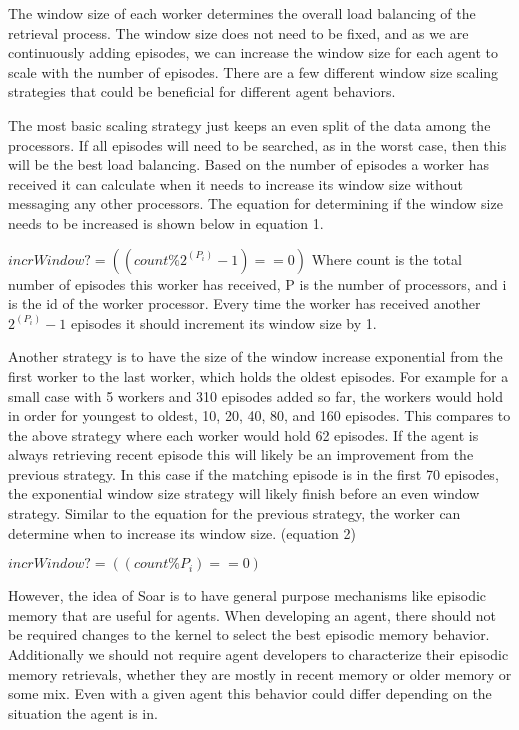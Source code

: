 \documentclass[11pt]{article} %
\begin{document}
The window size of each worker determines the overall load balancing of the
retrieval process. The window size does not need to be fixed, and as we are
continuously adding episodes, we can increase the window size for each agent to
scale with the number of episodes. There are a few different window size scaling
strategies that could be beneficial for different agent behaviors.

The most basic scaling strategy just keeps an even split of the data among the
processors. If all episodes will need to be searched, as in the worst case, then
this will be the best load balancing. Based on the number of episodes a worker
has received it can calculate when it needs to increase its window size without
messaging any other processors. The equation for determining if the window size
needs to be increased is shown below in equation 1.

$incrWindow? = ((count \%  2^(P_i) -1 ) == 0)$
Where count is the total number of episodes this worker has received, P is the
number of processors, and i is the id of the worker processor. Every time the
worker has received another $ 2^(P_i) -1 $ episodes it should increment its window
size by 1.

Another strategy is to have the size of the window increase exponential from the
first worker to the last worker, which holds the oldest episodes. For example
for a small case with 5 workers and 310 episodes added so far, the workers would
hold in order for youngest to oldest, 10, 20, 40, 80, and 160 episodes. This
compares to the above strategy where each worker would hold 62 episodes. If the
agent is always retrieving recent episode this will likely be an improvement
from the previous strategy. In this case if the matching episode is in the first
70 episodes, the exponential window size strategy will likely finish before an
even window strategy. Similar to the equation for the previous strategy, the
worker can determine when to increase its window size. (equation 2)

$incrWindow? = ((count \%  P_i ) == 0)$

However, the idea of Soar is to have general purpose mechanisms like episodic
memory that are useful for agents. When developing an agent, there should not be
required changes to the kernel to select the best episodic memory behavior.
Additionally we should not require agent developers to characterize their
episodic memory retrievals, whether they are mostly in recent memory or older
memory or some mix. Even with a given agent this behavior could differ depending
on the situation the agent is in.
\end{document}
